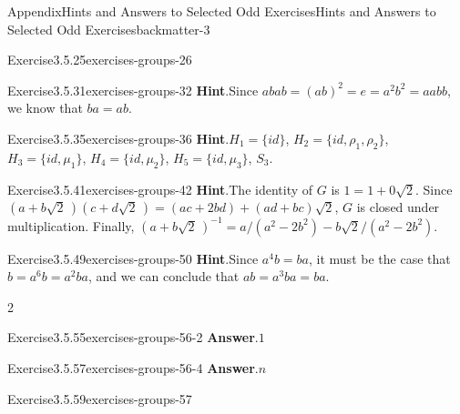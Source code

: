 \documentclass[oneside,10pt,]{book}
\newcommand{\blocktitlefont}{\relax}
\numberwithin{equation}{section}
\begin{document}
\begin{solutions-chapter}{Appendix}{Hints and Answers to Selected Odd Exercises}{}{Hints and Answers to Selected Odd Exercises}{}{}{backmatter-3}
\begin{divisionsolution}{Exercise}{3.5.25}{}{exercises-groups-26}
%
\end{divisionsolution}%
\begin{divisionsolution}{Exercise}{3.5.31}{}{exercises-groups-32}%
\noindent\textbf{\blocktitlefont Hint}.\hypertarget{exercises-groups-32-2-back}{}\quad{}Since \(abab = (ab)^2 = e = a^2 b^2 = aabb\), we know that \(ba = ab\).%
\end{divisionsolution}%
\begin{divisionsolution}{Exercise}{3.5.35}{}{exercises-groups-36}%
\noindent\textbf{\blocktitlefont Hint}.\hypertarget{exercises-groups-36-2-back}{}\quad{}\(H_1 = \{ id \}\), \(H_2 = \{ id, \rho_1, \rho_2 \}\), \(H_3 = \{ id, \mu_1 \}\), \(H_4 = \{ id, \mu_2 \}\), \(H_5 = \{ id, \mu_3 \}\), \(S_3\).%
\end{divisionsolution}%
\begin{divisionsolution}{Exercise}{3.5.41}{}{exercises-groups-42}%
\noindent\textbf{\blocktitlefont Hint}.\hypertarget{exercises-groups-42-2-back}{}\quad{}The identity of \(G\) is \(1 = 1 + 0 \sqrt{2}\). Since \((a + b \sqrt{2}\, )(c + d \sqrt{2}\, ) = (ac + 2bd) + (ad + bc)\sqrt{2}\), \(G\) is closed under multiplication.  Finally,  \((a + b \sqrt{2}\, )^{-1} = a/(a^2 - 2b^2) - b\sqrt{2}/(a^2 - 2 b^2)\).%
\end{divisionsolution}%
\begin{divisionsolution}{Exercise}{3.5.49}{}{exercises-groups-50}%
\noindent\textbf{\blocktitlefont Hint}.\hypertarget{exercises-groups-50-2-back}{}\quad{}Since \(a^4b = ba\), it must be the case that \(b = a^6 b = a^2 b a\), and we can conclude that \(ab = a^3 b a = ba\).%
\end{divisionsolution}%
\begin{exercisegroupcol}{2}
\begin{divisionsolutionegcol}{Exercise}{3.5.55}{}{exercises-groups-56-2}%
\noindent\textbf{\blocktitlefont Answer}.\hypertarget{exercises-groups-56-2-2-back}{}\quad{}\(1\)%
\end{divisionsolutionegcol}%
\begin{divisionsolutionegcol}{Exercise}{3.5.57}{}{exercises-groups-56-4}%
\noindent\textbf{\blocktitlefont Answer}.\hypertarget{exercises-groups-56-4-2-back}{}\quad{}\(n\)%
\end{divisionsolutionegcol}%
\end{exercisegroupcol}
\par\medskip\noindent
\begin{divisionsolution}{Exercise}{3.5.59}{}{exercises-groups-57}%
\begin{enumerate}[font=\bfseries,label=(\alph*),ref=\alph*]%

\end{enumerate}
\end{divisionsolution}
\end{solutions-chapter}
\end{document}
